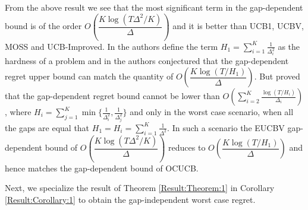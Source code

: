 

From the above result we see that the most significant term in the gap-dependent bound is of the order $O\left(\dfrac{K\log{(T\Delta^{2}/K)}}{\Delta}\right)$ and it is better than UCB1, UCBV, MOSS and UCB-Improved. In \cite{audibert2010best} the authors define the term $H_1=\sum_{i=1}^{K}\frac{1}{\Delta_i^2}$ as the hardness of a problem and in \cite{bubeck2012regret} the authors conjectured that the gap-dependent regret upper bound can match the quantity of $O\left(\dfrac{K\log{(T/H_1)}}{\Delta}\right)$. But \cite{lattimore2015optimally} proved that the gap-dependent regret bound cannot be lower than $O\left(\sum_{i=2}^{K}\frac{\log\left(T/H_i\right)}{\Delta_i}\right)$, where $H_i=\sum_{j=1}^{K}\min\lbrace \frac{1}{\Delta_i^2},\frac{1}{\Delta_j^2}\rbrace$ and only in the worst case scenario, when all the gaps are equal that $H_1=H_{i}=\sum_{i=1}^{K}\frac{1}{\Delta^2}$. In such a scenario the EUCBV gap-dependent bound of $O\left(\dfrac{K\log{(T\Delta^{2}/ K)}}{\Delta}\right)$ reduces to $O\left(\dfrac{K\log{(T/H_1)}}{\Delta}\right)$ and hence matches the gap-dependent bound of OCUCB.

Next, we specialize the result of Theorem \ref{Result:Theorem:1} in Corollary \ref{Result:Corollary:1} to  obtain the gap-independent worst case regret. %


